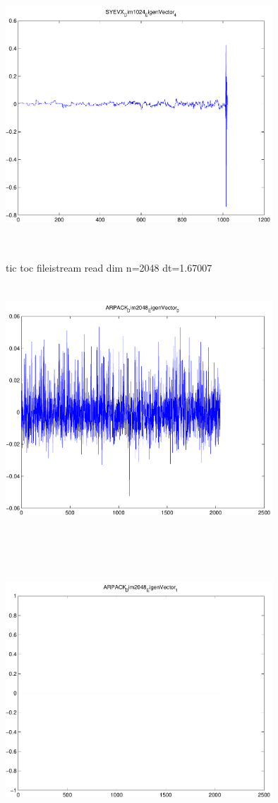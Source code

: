 \documentclass[9pt]{article}
\theoremstyle{plain}
\theoremstyle{definition}
\theoremstyle{remark}
\numberwithin{equation}{section}
\begin{document}
\includegraphics[width=10.0cm,height=10.0cm]{SYEVX_Dim1024_EigenVector_4.pdf}

tic toc fileistream read dim n=2048 dt=1.67007
\includegraphics[width=10.0cm,height=10.0cm]{ARPACK_Dim2048_EigenVector_0.pdf}

\includegraphics[width=10.0cm,height=10.0cm]{ARPACK_Dim2048_EigenVector_1.pdf}
\end{document}
